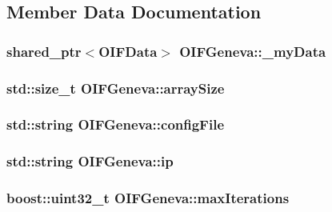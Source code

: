 \subsection{Member Data Documentation}
\hypertarget{classOIFGeneva_ae130ae2db7c8c880ff426eefc9191949}{
\subsubsection[{\_\-myData}]{\setlength{\rightskip}{0pt plus 5cm}shared\_\-ptr$<${\bf OIFData}$>$ {\bf OIFGeneva::\_\-myData}}}
\label{d4/dce/classOIFGeneva_ae130ae2db7c8c880ff426eefc9191949}
\hypertarget{classOIFGeneva_ae17ccd19943bfe1ced5f7b0373c36ee9}{
\subsubsection[{arraySize}]{\setlength{\rightskip}{0pt plus 5cm}std::size\_\-t {\bf OIFGeneva::arraySize}}}
\label{d4/dce/classOIFGeneva_ae17ccd19943bfe1ced5f7b0373c36ee9}
\hypertarget{classOIFGeneva_abf5610433384454ae4884b2f17f01f01}{
\subsubsection[{configFile}]{\setlength{\rightskip}{0pt plus 5cm}std::string {\bf OIFGeneva::configFile}}}
\label{d4/dce/classOIFGeneva_abf5610433384454ae4884b2f17f01f01}
\hypertarget{classOIFGeneva_a24b10918d314755d3c566ea8c17b2bc1}{
\subsubsection[{ip}]{\setlength{\rightskip}{0pt plus 5cm}std::string {\bf OIFGeneva::ip}}}
\label{d4/dce/classOIFGeneva_a24b10918d314755d3c566ea8c17b2bc1}
\hypertarget{classOIFGeneva_ae2a0cd2de953edc56ffa0dbb743fc9af}{
\subsubsection[{maxIterations}]{\setlength{\rightskip}{0pt plus 5cm}boost::uint32\_\-t {\bf OIFGeneva::maxIterations}}}
